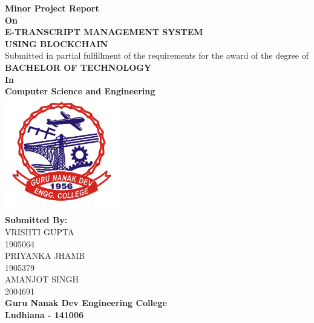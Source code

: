 


\begin{titlepage}

\begin{center}


\textup{\Huge {\bf Minor Project Report }}\\[0.3in]
\textup{\Huge {\bf On}}\\[0.2in]
\textup{\Huge {\bf E-TRANSCRIPT MANAGEMENT SYSTEM \\[0.1cm] USING BLOCKCHAIN}}\\[0.5in]
\large{Submitted in partial fulfillment of the requirements for the award of the degree of}\\[0.2in]




       

\Large {\bf BACHELOR OF TECHNOLOGY}\\
\Large {\bf In}\\
\Large {\bf Computer Science and Engineering}\\[0.5in]


\includegraphics[width=5cm]{images/gneLogo.png}\\[0.5cm]

\Large{\textbf{Submitted By:}}\\[0.2in]
\large{VRISHTI GUPTA}\\
\large{1905064}\\
\large{PRIYANKA JHAMB}\\
\large{1905379}\\
\large{AMANJOT SINGH}\\
\large{2004691}\\[0.5in]



\Large{\textbf{Guru Nanak Dev Engineering College\\[0.2cm]
Ludhiana - 141006}}
\end{center}
\end{titlepage}
